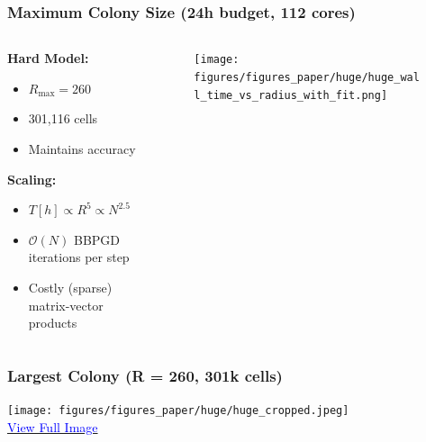 \documentclass[10pt,t]{beamer}
\begin{document}
\begin{frame}
    \frametitle{Maximum Colony Size (24h budget, 112 cores)}

    \begin{columns}
        \begin{column}{0.45\textwidth}
            \textbf{Hard Model:}
            \begin{itemize}
                \item $R_{\max} = 260$
                \item 301,116 cells
                \item Maintains accuracy
            \end{itemize}

            \vspace{0.2cm}

            \textbf{Scaling:}
            \begin{itemize}
                \item $T[h] \propto R^5 \propto N^{2.5}$
                \item $\mathcal{O}(N)$ BBPGD iterations per step
                \item Costly (sparse) matrix-vector products
            \end{itemize}
        \end{column}

        \begin{column}{0.55\textwidth}
            \begin{figure}
                \centering
                \texttt{[image: figures/figures\_paper/huge/huge\_wall\_time\_vs\_radius\_with\_fit.png]}
            \end{figure}
        \end{column}

    \end{columns}

\end{frame}

\begin{frame}
    \frametitle{Largest Colony (R = 260, 301k cells)}

    \begin{center}
        {\texttt{[image: figures/figures\_paper/huge/huge\_cropped.jpeg]}}\\[0.6em]
        \small
        \href{https://home.cit.tum.de/~ler/bacteria/videos/huge_high_quality.jpeg}{\textcolor{blue}{{View Full Image}}}
    \end{center}
\end{frame}
\end{document}
